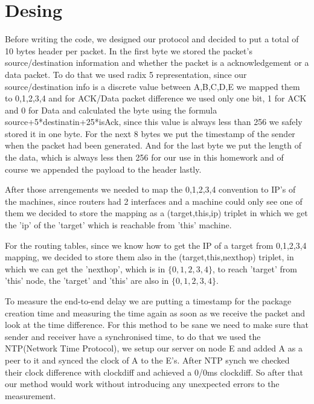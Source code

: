 \documentclass[12pt]{article}
\begin{document}
\section*{Desing}
Before writing the code, we designed our protocol and decided to
put a total of 10 bytes header per packet. In the first byte we
stored the packet's source/destination information and whether
the packet is a acknowledgement or a data packet. To do that
we used radix 5 representation, since our source/destination
info is a discrete value between A,B,C,D,E we mapped them to
0,1,2,3,4 and for ACK/Data packet difference we used only one bit,
1 for ACK and 0 for Data and calculated the byte using the formula
source+5*destinatin+25*isAck, since this value is always less than
256 we safely stored it in one byte. For the next 8 bytes we put
the timestamp of the sender when the packet had been generated.
And for the last byte we put the length of the data, which is
always less then 256 for our use in this homework and of course
we appended the payload to the header lastly.

After those arrengements we needed to map the 0,1,2,3,4 convention to
IP's of the machines, since routers had 2 interfaces and a machine could
only see one of them we decided to store the mapping as a (target,this,ip)
triplet in which we get the 'ip' of the 'target' which is reachable from 'this'
machine.

For the routing tables, since we know how to get the IP of a target from
0,1,2,3,4 mapping, we decided to store them also in the (target,this,nexthop)
triplet, in which we can get the 'nexthop', which is in $\{0,1,2,3,4\}$, to reach
'target' from 'this' node, the 'target' and 'this' are also in $\{0,1,2,3,4\}$.

To measure the end-to-end delay we are putting a timestamp for the package
creation time and measuring the time again as soon as we receive the packet
and look at the time difference. For this method to be sane we need to make
sure that sender and receiver have a synchronised time, to do that we used
the NTP(Network Time Protocol), we setup our server on node E and added A
as a peer to it and synced the clock of A to the E's. After NTP synch we 
checked their clock difference with clockdiff and achieved a 0/0ms clockdiff.
So after that our method would work without introducing any unexpected errors
to the measurement.
\end{document}

